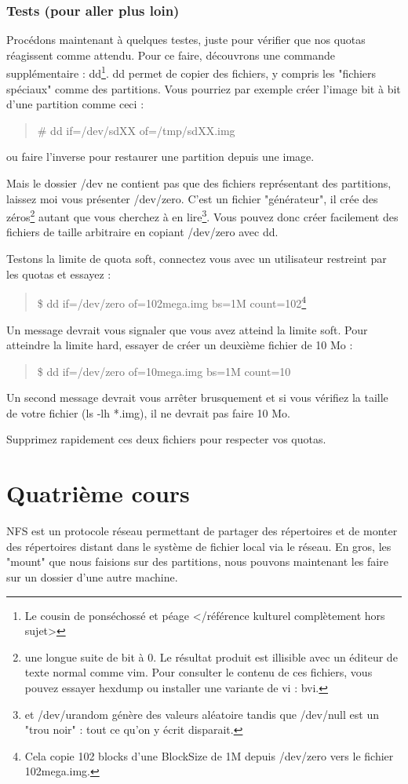 \documentclass[a4paper,11pt]{article}
\newcommand{\commande}[1] {
    \begin{quote}
    \tt\raggedright #1 
    \end{quote}
}
\begin{document}
\subsubsection{Tests (pour aller plus loin)}
\par Procédons maintenant à quelques testes, juste pour vérifier que nos quotas réagissent comme attendu. Pour ce faire, découvrons une commande supplémentaire : dd\footnote{Le cousin de ponséchossé et péage </référence kulturel complètement hors sujet>}. dd permet de copier des fichiers, y compris les "fichiers spéciaux" comme des partitions. Vous pourriez par exemple créer l'image bit à bit d'une partition comme ceci :
\commande{\# dd if=/dev/sdXX of=/tmp/sdXX.img}
ou faire l'inverse pour restaurer une partition depuis une image.
\par Mais le dossier /dev ne contient pas que des fichiers représentant des partitions, laissez moi vous présenter /dev/zero. C'est un fichier "générateur", il crée des zéros\footnote{une longue suite de bit à 0. Le résultat produit est illisible avec un éditeur de texte normal comme vim. Pour consulter le contenu de ces fichiers, vous pouvez essayer hexdump ou installer une variante de vi : bvi.} autant que vous cherchez à en lire\footnote{et /dev/urandom génère des valeurs aléatoire tandis que /dev/null est un "trou noir" : tout ce qu'on y écrit disparait.}. Vous pouvez donc créer facilement des fichiers de taille arbitraire en copiant /dev/zero avec dd.
\par Testons la limite de quota soft, connectez vous avec un utilisateur restreint par les quotas et essayez :
\commande{\$ dd if=/dev/zero of=102mega.img bs=1M count=102\footnote{Cela copie 102 blocks d'une BlockSize de 1M depuis /dev/zero vers le fichier 102mega.img.}}
Un message devrait vous signaler que vous avez atteind la limite soft. Pour atteindre la limite hard, essayer de créer un deuxième fichier de 10 Mo :
\commande{\$ dd if=/dev/zero of=10mega.img bs=1M count=10}
Un second message devrait vous arrêter brusquement et si vous vérifiez la taille de votre fichier (ls -lh *.img), il ne devrait pas faire 10 Mo.
\par Supprimez rapidement ces deux fichiers pour respecter vos quotas.

\section{Quatrième cours}
\par NFS est un protocole réseau permettant de partager des répertoires et de monter des répertoires distant dans le système de fichier local via le réseau. En gros, les "mount" que nous faisions sur des partitions, nous pouvons maintenant les faire sur un dossier d'une autre machine.
\end{document}
